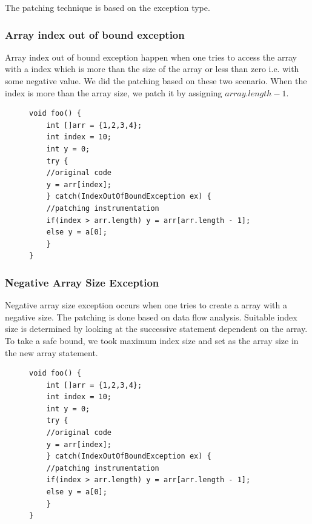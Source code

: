 The patching technique is based on the exception type. 

\subsubsection{Array index out of bound exception}

Array index out of bound exception happen when one tries to access the array
with a index which is more than the size of the array or 
less than zero i.e. with some negative value. We did the patching based on these
two scenario. When the index is more than the array size, 
we patch it by assigning $array.length - 1$.

\lstset{language=Java, caption=array index out of bound patching,
label=patchingexample2}
\begin{figure}[t]
\begin{lstlisting}[countblanklines=false]
void foo() {
    int []arr = {1,2,3,4};
    int index = 10;
    int y = 0;
    try {
	//original code
	y = arr[index];
    } catch(IndexOutOfBoundException ex) {
	//patching instrumentation
	if(index > arr.length) y = arr[arr.length - 1];
	else y = a[0];
    }
}
\end{lstlisting}
\end{figure}

\subsubsection{Negative Array Size Exception}

Negative array size exception occurs when one tries to create a array with a
negative size. 
The patching is done based on data flow analysis. Suitable index size is
determined by looking at the successive statement dependent on the array. 
To take a safe bound, we took maximum index size and set as the array size in
the new array statement.


\lstset{language=Java, caption=arr index out of bound patching,
label=patchingexample2}
\begin{figure}[t]
\begin{lstlisting}[countblanklines=false]
void foo() {
    int []arr = {1,2,3,4};
    int index = 10;
    int y = 0;
    try {
	//original code
	y = arr[index];
    } catch(IndexOutOfBoundException ex) {
	//patching instrumentation
	if(index > arr.length) y = arr[arr.length - 1];
	else y = a[0];
    }
}
\end{lstlisting}
\end{figure}

